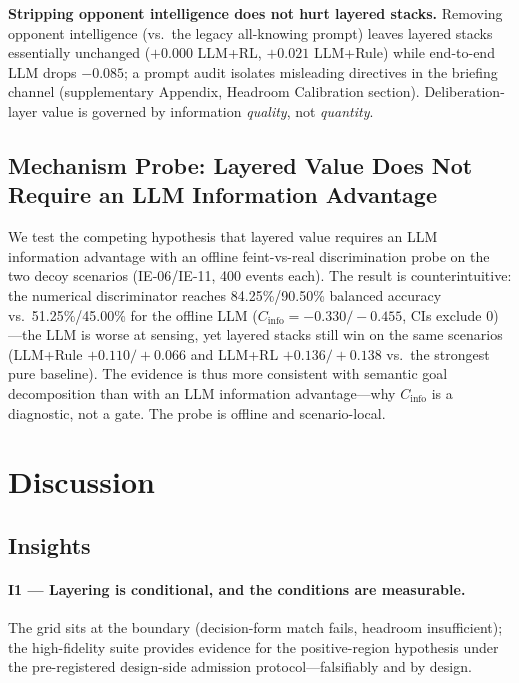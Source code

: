 \documentclass[sigconf,anonymous]{aamas}
\newcommand{\Cinfo}{C_{\mathrm{info}}}
\begin{document}
\textbf{Stripping opponent intelligence does not hurt layered stacks.} Removing opponent intelligence (vs.\ the legacy all-knowing prompt) leaves layered stacks essentially unchanged ($+0.000$ LLM+RL, $+0.021$ LLM+Rule) while end-to-end LLM drops $-0.085$; a prompt audit isolates misleading directives in the briefing channel (supplementary Appendix, Headroom Calibration section). Deliberation-layer value is governed by information \emph{quality}, not \emph{quantity}.

\subsection{Mechanism Probe: Layered Value Does Not Require an LLM Information Advantage}\label{sec:mechanism}

We test the competing hypothesis that layered value requires an LLM information advantage with an offline feint-vs-real discrimination probe on the two decoy scenarios (IE-06/IE-11, 400 events each). The result is counterintuitive: the numerical discriminator reaches 84.25\%/90.50\% balanced accuracy vs.\ 51.25\%/45.00\% for the offline LLM ($\Cinfo=-0.330/-0.455$, CIs exclude 0)---the LLM is worse at sensing, yet layered stacks still win on the same scenarios (LLM+Rule $+0.110/+0.066$ and LLM+RL $+0.136/+0.138$ vs.\ the strongest pure baseline). The evidence is thus more consistent with semantic goal decomposition than with an LLM information advantage---why $\Cinfo$ is a diagnostic, not a gate. The probe is offline and scenario-local.

\section{Discussion}\label{sec:discussion}

\subsection{Insights}\label{sec:insights}

\paragraph{I1 --- Layering is conditional, and the conditions are measurable.}
The grid sits at the boundary (decision-form match fails, headroom insufficient); the high-fidelity suite provides evidence for the positive-region hypothesis under the pre-registered design-side admission protocol---falsifiably and by design.
\end{document}
